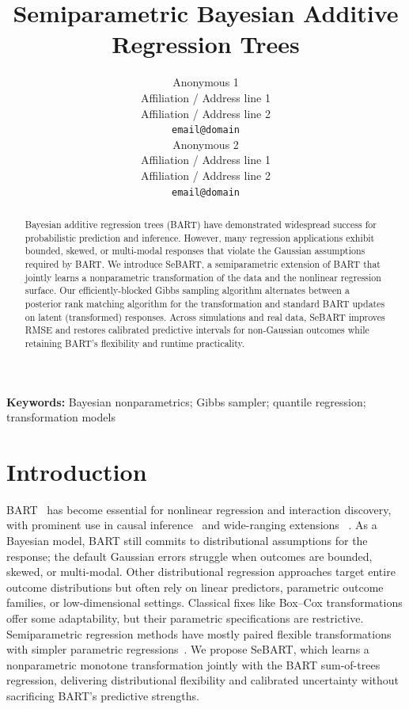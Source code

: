 \documentclass[10pt]{article}
\title{Semiparametric Bayesian Additive Regression Trees}
\author{  Anonymous 1 \\
  Affiliation / Address line 1 \\
  Affiliation / Address line 2 \\
  {\tt email@domain} \\\And
 Anonymous 2 \\
  Affiliation / Address line 1 \\
  Affiliation / Address line 2 \\
  {\tt email@domain}}
\date{}
\begin{document}
\maketitle
\begin{abstract}
Bayesian additive regression trees (BART) have demonstrated widespread success for probabilistic prediction and inference. However, many regression applications exhibit bounded, skewed, or multi-modal responses that violate the Gaussian assumptions required by BART. We introduce SeBART, a semiparametric extension of BART that jointly learns a nonparametric transformation of the data and the nonlinear regression surface. Our efficiently-blocked Gibbs sampling algorithm alternates between a posterior rank matching algorithm for the transformation and standard BART updates on latent (transformed) responses. Across simulations and real data, SeBART improves RMSE and restores calibrated predictive intervals for non-Gaussian outcomes while retaining BART's flexibility and runtime practicality.
\end{abstract}

{\bf Keywords:} Bayesian nonparametrics; Gibbs sampler; quantile regression; transformation models

\section{Introduction}
BART~\cite{Chipman_2010} has become essential for nonlinear regression and interaction discovery, with prominent use in causal inference~\cite{Hill01012011} and wide-ranging extensions ~\cite{annurev:/content/journals/10.1146/annurev-statistics-031219-041110}. As a Bayesian model, BART still commits to distributional assumptions for the response; the default Gaussian errors struggle when outcomes are bounded, skewed, or multi-modal. Other distributional regression approaches  \cite{annurev:/content/journals/10.1146/annurev-statistics-040722-053607} target entire outcome distributions but often rely on linear predictors, parametric outcome families, or low-dimensional settings. Classical fixes like Box--Cox transformations \cite{10.1111/j.2517-6161.1964.tb00553.x} offer some adaptability, but their parametric specifications are restrictive. Semiparametric regression methods have mostly paired flexible transformations with simpler parametric regressions~\cite{Kowal_2024}. We propose SeBART, which learns a nonparametric monotone transformation jointly with the BART sum-of-trees regression, delivering distributional flexibility and calibrated uncertainty without sacrificing BART's predictive strengths.
\end{document}
